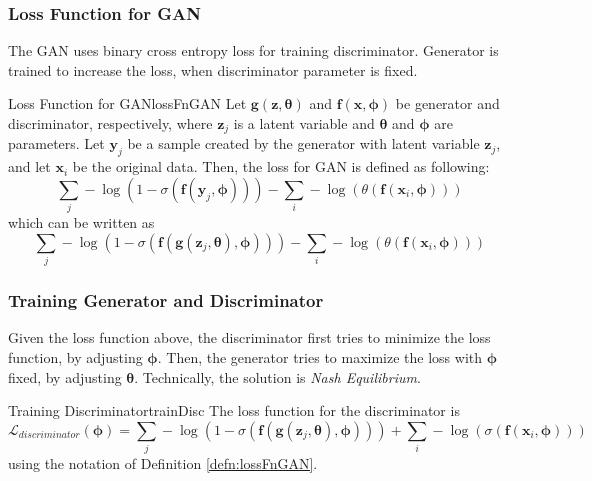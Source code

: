 \documentclass{article}
\begin{document}
        \subsubsection{Loss Function for GAN}
            The GAN uses binary cross entropy loss for training discriminator. Generator is trained to increase the loss, when
            discriminator parameter is fixed.
            \begin{defn}{Loss Function for GAN}{lossFnGAN}
                Let $\textbf{g}(\textbf{z}, \bm{\theta})$ and $\textbf{f}(\textbf{x}, \bm{\phi})$ be generator and discriminator, respectively,
                where $\textbf{z}_j$ is a latent variable and $\bm{\theta}$ and $\bm{\phi}$ are parameters.
                Let $\textbf{y}_j$ be a sample created by the generator with latent variable $\textbf{z}_j$,
                and let $\textbf{x}_i$ be the original data.
                Then, the loss for GAN is defined as following:
                \[
                \sum_{j} -\log{(1 - \sigma(\textbf{f}(\textbf{y}_j, \bm{\phi})))}
                -\sum_{i} -\log{(\theta(\textbf{f}(\textbf{x}_i, \bm{\phi})))}
                \]
                which can be written as
                \[
                \sum_{j} -\log{(1 - \sigma(\textbf{f}(\textbf{g}(\mathbf{z}_j, \bm{\theta}), \bm{\phi})))}
                -\sum_{i} -\log{(\theta(\textbf{f}(\textbf{x}_i, \bm{\phi})))}
                \]
                
            \end{defn}
        \subsubsection{Training Generator and Discriminator}
            Given the loss function above, the discriminator first tries to minimize the loss function,
            by adjusting $\bm{\phi}$. Then, the generator tries to maximize the loss with $\bm{\phi}$ fixed, by
            adjusting $\bm{\theta}$. Technically, the solution is \emph{Nash Equilibrium}.

            \begin{defn}{Training Discriminator}{trainDisc}
                The loss function for the discriminator is
                \[
                \mathcal L_{discriminator} (\bm{\phi}) = \sum_{j} -\log{(1 - \sigma(\textbf{f}(\textbf{g}(\mathbf{z}_j, \bm{\theta}), \bm{\phi})))}
                + \sum_{i} -\log{(\sigma(\textbf{f}(\textbf{x}_i, \bm{\phi})))}
                \]
                using the notation of Definition \ref{defn:lossFnGAN}.
            \end{defn}
\end{document}
